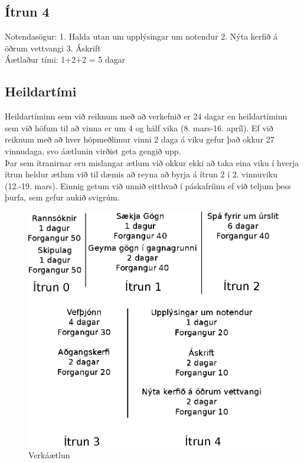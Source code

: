 \documentclass[a4paper,11pt]{article}
\begin{document}
\subsection{Ítrun 4}
Notendasögur: 1. Halda utan um upplýsingar um notendur 2. Nýta kerfið á öðrum vettvangi 3. Áskrift\\
Áætlaður tími: 1+2+2 = 5 dagar

\subsection{Heildartími}
Heildartíminn sem við reiknum með að verkefnið er 24 dagar en heildartíminn sem við höfum til að vinna er um 4 og hálf vika (8. mars-16. apríl). Ef við reiknum með að hver hópmeðlimur vinni 2 daga á viku gefur það okkur 27 vinnudaga, svo áætlunin virðist geta gengið upp.\\

Þar sem ítranirnar eru mislangar ætlum við okkur ekki að taka eina viku í hverja ítrun heldur ætlum við til dæmis að reyna að byrja á ítrun 2 í 2. vinnuviku (12.-19. mars). Einnig getum við unnið eitthvað í páskafríinu ef við teljum þess þurfa, sem gefur aukið svigrúm. 
\begin{figure}[H]
  \centering
  \includegraphics{verkaetlunarmynd}
  \caption{Verkáætlun}
  \label{fig:verkaetlun}
\end{figure}
\end{document}
